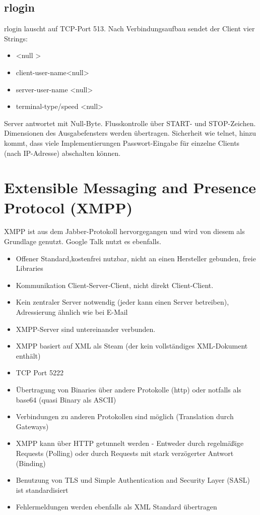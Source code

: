\documentclass{article} %
\begin{document}
\subsection{rlogin}
rlogin\cite{rfc1258} lauscht auf TCP-Port 513.
Nach Verbindungsaufbau sendet der Client vier Strings:
\begin{itemize}
	\item \textless null \textgreater
	\item client-user-name\textless null\textgreater
	\item server-user-name \textless null\textgreater
	\item terminal-type/speed \textless null\textgreater
\end{itemize}
Server antwortet mit Null-Byte.
Flusskontrolle über START- und STOP-Zeichen.
Dimensionen des Ausgabefensters werden übertragen.
Sicherheit wie telnet, hinzu kommt, dass viele Implementierungen Passwort-Eingabe für einzelne Clients (nach IP-Adresse) abschalten können.
\section{Extensible Messaging and Presence Protocol (XMPP)}
XMPP ist aus dem Jabber-Protokoll hervorgegangen und wird von diesem als Grundlage genutzt. Google Talk nutzt es ebenfalls.\\
	\begin{itemize}
	\item Offener Standard,kostenfrei nutzbar, nicht an einen Hersteller gebunden, freie Libraries 
	\item Kommunikation Client-Server-Client, nicht direkt Client-Client. 
	\item Kein zentraler Server notwendig (jeder kann einen Server betreiben), Adressierung ähnlich wie bei E-Mail 
	\item XMPP-Server sind untereinander verbunden. 
	\item XMPP basiert auf XML als Steam (der kein vollständiges XML-Dokument enthält)
	\item TCP Port 5222 
	\item Übertragung von Binaries über andere Protokolle (http) oder notfalls als base64 (quasi Binary als ASCII) 
	\item Verbindungen zu anderen Protokollen sind möglich (Translation durch Gateways) 
	\item XMPP kann über HTTP getunnelt werden - Entweder durch regelmäßige Requests (Polling) oder durch Requests mit stark verzögerter Antwort (Binding) 
	\item Benutzung von TLS und Simple Authentication and Security Layer (SASL) ist standardisiert
	\item Fehlermeldungen werden ebenfalls als XML Standard übertragen 
	\end{itemize}
\end{document}
